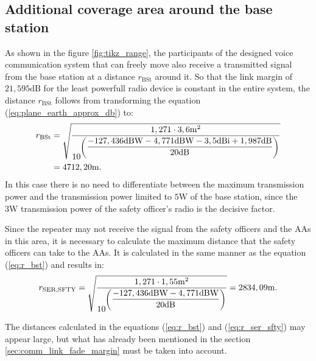 \subsection{Additional coverage area around the base station}
As shown in the figure \ref{fig:tikz_range}, the participants of the designed voice communication system that can freely move also receive a transmitted signal from the base station at a distance $r_\mathrm{BSt}$ around it. So that the link margin of $21,595\mathrm{dB}$ for the least powerfull radio device is constant in the entire system, the distance $r_\mathrm{BSt}$ follows from transforming the equation (\ref{eq:plane_earth_approx_db}) to: 
\begin{equation} \label{eq:r_bst}
	\centering
	\begin{aligned}
	r_\mathrm{BSt} &= \sqrt{\dfrac{1,271 \cdot 3,6 \mathrm{m}^2}{10^{\left(\dfrac{-127,436\mathrm{dBW} - 4,771\mathrm{dBW} - 3,5\mathrm{dBi} + 1,987\mathrm{dB}}{20\mathrm{dB}}\right)}}} \\ 
	&= 4712,20\mathrm{m}\text{.}
	\end{aligned}
\end{equation}
In this case there is no need to differentiate between the maximum transmission power and the transmission power limited to $5\mathrm{W}$ of the base station, since the $3\mathrm{W}$ transmission power of the safety officer's radio is the decisive factor. 

Since the repeater may not receive the signal from the safety officers and the AAs in this area, it is necessary to calculate the maximum distance that the safety officers can take to the AAs. It is calculated in the same manner as the equation (\ref{eq:r_bst}) and results in:
\begin{equation} \label{eq:r_ser_sfty}
	\centering
	r_\mathrm{SER,SFTY} = \sqrt{\dfrac{1,271 \cdot 1,55 \mathrm{m}^2}{10^{\left(\dfrac{-127,436\mathrm{dBW} - 4,771\mathrm{dBW}}{20\mathrm{dB}}\right)}}} = 2834,09\mathrm{m}\text{.}
\end{equation}

The distances calculated in the equations (\ref{eq:r_bst}) and (\ref{eq:r_ser_sfty}) may appear large, but what has already been mentioned in the section \ref{sec:comm_link_fade_margin} must be taken into account. 
